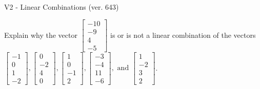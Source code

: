 \begin{exercise}
  \begin{exerciseTitle}V2 - Linear Combinations (ver. 643)\end{exerciseTitle}
  \begin{exerciseStatement}
    Explain why the vector \(\left[\begin{array}{c}
-10 \\
-9 \\
4 \\
-5
\end{array}\right]\)  is or is not a linear 
	combination of the vectors \(\left[\begin{array}{c}
-1 \\
0 \\
1 \\
-2
\end{array}\right] , \left[\begin{array}{c}
0 \\
-2 \\
4 \\
0
\end{array}\right] , \left[\begin{array}{c}
1 \\
0 \\
-1 \\
2
\end{array}\right] , \left[\begin{array}{c}
-3 \\
-4 \\
11 \\
-6
\end{array}\right] , \text{ and } \left[\begin{array}{c}
1 \\
-2 \\
3 \\
2
\end{array}\right]\).
	



\end{exerciseStatement}
\end{exercise}

